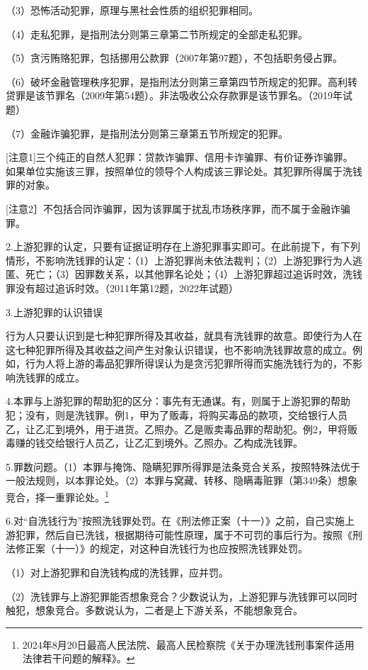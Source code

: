 （3）恐怖活动犯罪，原理与黑社会性质的组织犯罪相同。

（4）走私犯罪，是指刑法分则第三章第二节所规定的全部走私犯罪。

（5）贪污贿赂犯罪，包括挪用公款罪（2007年第97题），不包括职务侵占罪。

（6）破坏金融管理秩序犯罪，是指刑法分则第三章第四节所规定的犯罪。高利转贷罪是该节罪名（2009年第54题）。非法吸收公众存款罪是该节罪名。（2019年试题）

（7）金融诈骗犯罪，是指刑法分则第三章第五节所规定的犯罪。

[注意1]三个纯正的自然人犯罪：贷款诈骗罪、信用卡诈骗罪、有价证券诈骗罪。如果单位实施该三罪，按照单位的领导个人构成该三罪论处。其犯罪所得属于洗钱罪的对象。

[注意2］不包括合同诈骗罪，因为该罪属于扰乱市场秩序罪，而不属于金融诈骗罪。

2.上游犯罪的认定，只要有证据证明存在上游犯罪事实即可。在此前提下，有下列情形，不影响洗钱罪的认定：（1）上游犯罪尚未依法裁判；（2）上游犯罪行为人逃匿、死亡；（3）因罪数关系，以其他罪名论处；（4）上游犯罪超过追诉时效，洗钱罪没有超过追诉时效。（2011年第12题，2022年试题）

3.上游犯罪的认识错误

行为人只要认识到是七种犯罪所得及其收益，就具有洗钱罪的故意。即使行为人在这七种犯罪所得及其收益之间产生对象认识错误，也不影响洗钱罪故意的成立。例如，行为人将上游的毒品犯罪所得误认为是贪污犯罪所得而实施洗钱行为的，不影响洗钱罪的成立。

4.本罪与上游犯罪的帮助犯的区分：事先有无通谋。有，则属于上游犯罪的帮助犯；没有，则是洗钱罪。例1，甲为了贩毒，将购买毒品的款项，交给银行人员乙，让乙汇到境外，用于进货。乙照办。乙是贩卖毒品罪的帮助犯。例2，甲将贩毒赚的钱交给银行人员乙，让乙汇到境外。乙照办。乙构成洗钱罪。

5.罪数问题。（1）本罪与掩饰、隐瞒犯罪所得罪是法条竞合关系，按照特殊法优于一般法规则，以本罪论处。（2）本罪与窝藏、转移、隐瞒毒赃罪（第349条）想象竞合，择一重罪论处。\footnote{2024年8月20日最高人民法院、最高人民检察院《关于办理洗钱刑事案件适用法律若干问题的解释》。}

6.对“自洗钱行为”按照洗钱罪处罚。在《刑法修正案（十一）》之前，自己实施上游犯罪，然后自已洗钱，根据期待可能性原理，属于不可罚的事后行为。按照《刑法修正案（十一）》的规定，对这种自洗钱行为也应按照洗钱罪处罚。

（1）对上游犯罪和自洗钱构成的洗钱罪，应并罚。

（2）洗钱罪与上游犯罪能否想象竞合？少数说认为，上游犯罪与洗钱罪可以同时触犯，想象竞合。多数说认为，二者是上下游关系，不能想象竞合。

